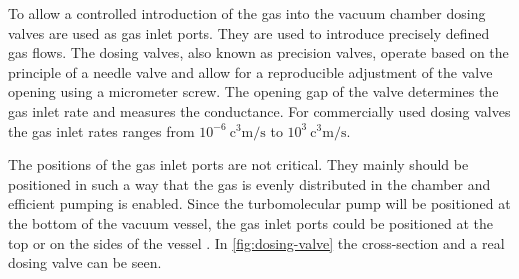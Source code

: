 To allow a controlled introduction of the gas into the vacuum chamber dosing valves are used as gas inlet ports.
They are used to introduce precisely defined gas flows.
The dosing valves, also known as precision valves, operate based on the principle of a needle valve and allow for a reproducible adjustment of the valve opening using a micrometer screw.
The opening gap of the valve determines the gas inlet rate and measures the conductance.
For commercially used dosing valves the gas inlet rates ranges from $10^{-6}~\si{\cubic\centi\meter\per\second}$ to $10^{3}~\si{\cubic\centi\meter\per\second}$.

The positions of the gas inlet ports are not critical.
They mainly should be positioned in such a way that the gas is evenly distributed in the chamber and efficient pumping is enabled.
Since the turbomolecular pump will be positioned at the bottom of the vacuum vessel, the gas inlet ports could be positioned at the top or on the sides of the vessel \cite{Wutz2000}. In \autoref{fig:dosing-valve} the cross-section and a real dosing valve can be seen.

